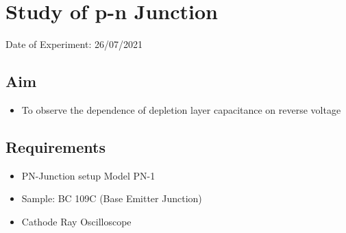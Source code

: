 


	
	\chapter{Study of p-n Junction} %
	\vspace{-1cm}
	
	\begin{center}%
		Date of Experiment: 26/07/2021
	\end{center}
	
	
	\section{Aim}
	\begin{itemize}
		\item 	To observe the dependence of depletion layer capacitance on reverse voltage
	\end{itemize}
	
	\section{Requirements}
	\begin{itemize}
		\item 	PN-Junction setup Model PN-1
		\item 	Sample: BC 109C (Base Emitter Junction)
		\item 	Cathode Ray Oscilloscope
	\end{itemize}
	
